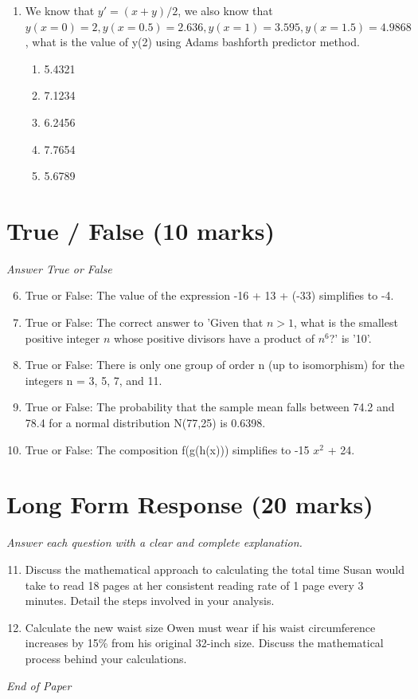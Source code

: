 \documentclass[12pt]{article}
\begin{document}
\begin{enumerate}[label=\arabic*.]
\begin{enumerate}[label=(\alph*)]
    \item multiply 180 by 2
    \item divide 180 by 20
\end{enumerate}
\item We know that $y'=(x+y) / 2$, we also know that $y(x=0) = 2, y(x=0.5) = 2.636, y(x=1) = 3.595, y(x=1.5) = 4.9868$, what is the value of y(2) using Adams bashforth predictor method.
\begin{enumerate}[label=(\alph*)]
    \item 5.4321
    \item 7.1234
    \item 6.2456
    \item 7.7654
    \item 5.6789
\end{enumerate}
\end{enumerate}

\section*{True / False (10 marks)}
\textit{Answer True or False}
\begin{enumerate}[label=\arabic*.]
\setcounter{enumi}{5}
\item True or False: The value of the expression -16 + 13 + (-33) simplifies to -4.
\item True or False: The correct answer to 'Given that $n > 1$, what is the smallest positive integer $n$ whose positive divisors have a product of $n^6$?' is '10'.
\item True or False: There is only one group of order n (up to isomorphism) for the integers n = 3, 5, 7, and 11.
\item True or False: The probability that the sample mean falls between 74.2 and 78.4 for a normal distribution N(77,25) is 0.6398.
\item True or False: The composition f(g(h(x))) simplifies to -15 $x^2$ + 24.
\end{enumerate}

\section*{Long Form Response (20 marks)}
\textit{Answer each question with a clear and complete explanation.}
\begin{enumerate}[label=\arabic*.]
\setcounter{enumi}{10}
\item Discuss the mathematical approach to calculating the total time Susan would take to read 18 pages at her consistent reading rate of 1 page every 3 minutes. Detail the steps involved in your analysis.
\item Calculate the new waist size Owen must wear if his waist circumference increases by 15\% from his original 32-inch size. Discuss the mathematical process behind your calculations.
\end{enumerate}

\vfill
\noindent\textit{End of Paper}
\end{document}
